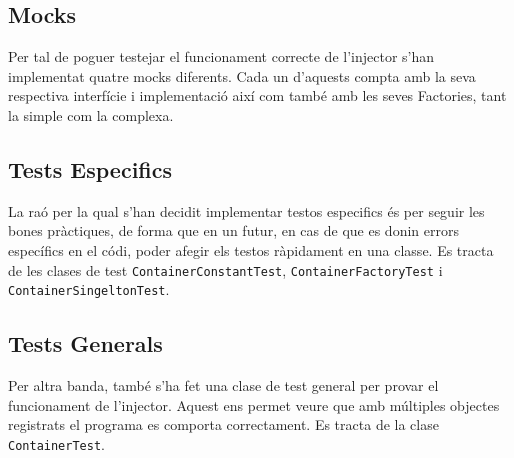 
\subsection{Mocks}
Per tal de poguer testejar el funcionament correcte de l'injector s'han implementat quatre mocks diferents. Cada un d'aquests compta amb la seva respectiva interfície i implementació així com també amb les seves Factories, tant la simple com la complexa.
\subsection{Tests Especifics}
La raó per la qual s'han decidit implementar testos especifics és per seguir les bones pràctiques, de forma que en un futur, en cas de que es donin errors específics en el códi, poder afegir els testos ràpidament en una classe. Es tracta de les clases de test \texttt{ContainerConstantTest}, \texttt{ContainerFactoryTest} i \texttt{ContainerSingeltonTest}.
\subsection{Tests Generals}
Per altra banda, també s'ha fet una clase de test general per provar el funcionament de l'injector. Aquest ens permet veure que amb múltiples objectes registrats el programa es comporta correctament. Es tracta de la clase \texttt{ContainerTest}.

